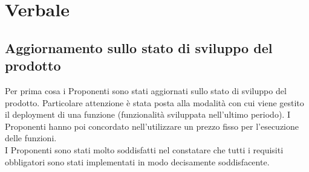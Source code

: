 \section{Verbale}
\subsection{Aggiornamento sullo stato di sviluppo del prodotto}
Per prima cosa i Proponenti\textit{} sono stati aggiornati sullo stato di sviluppo del prodotto\textit{}. Particolare attenzione è stata posta alla modalità con cui viene gestito il deployment\textit{} di una funzione (funzionalità sviluppata nell'ultimo periodo). I Proponenti\textit{} hanno poi concordato nell'utilizzare un prezzo fisso per l'esecuzione delle funzioni.
\\
I Proponenti\textit{} sono stati molto soddisfatti nel constatare che tutti i requisiti obbligatori sono stati implementati in modo decisamente soddisfacente.

